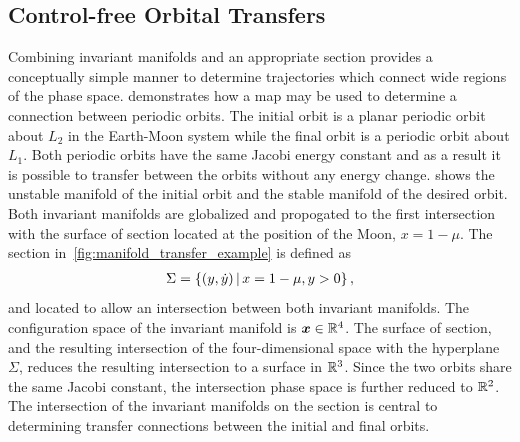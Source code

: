 \documentclass[preprint]{elsarticle}
\begin{document}
\subsection{Control-free Orbital Transfers}\label{sec:control-free_transfers}
Combining invariant manifolds and an appropriate \Poincare section provides a conceptually simple manner to determine trajectories which connect wide regions of the phase space.
 demonstrates how a \Poincare map may be used to determine a connection between periodic orbits.
The initial orbit is a planar periodic orbit about \( L_2 \) in the Earth-Moon system while the final orbit is a periodic orbit about \( L_1 \).
Both periodic orbits have the same Jacobi energy constant and as a result it is possible to transfer between the orbits without any energy change.
 shows the unstable manifold of the initial orbit and the stable manifold of the desired orbit. 
Both invariant manifolds are globalized and propogated to the first intersection with the \Poincare surface of section located at the position of the Moon, \( x = 1 - \mu \).
The \Poincare section in~\cref{fig:manifold_transfer_example} is defined as
\begin{align*}
	\Sigma = \left\{  ( y, \dot{y}) \, | \, x = 1- \mu, y > 0 \right\} , 
\end{align*}
and located to allow an intersection between both invariant manifolds.
The configuration space of the invariant manifold is \( \boldsymbol{x} \in \mathbb{R}^4 \).
The surface of section, and the resulting intersection of the four-dimensional space with the hyperplane \( \Sigma \), reduces the resulting intersection to a surface in \( \mathbb{R}^3\).
Since the two orbits share the same Jacobi constant, the intersection phase space is further reduced to \( \mathbb{R}^2\).
The intersection of the invariant manifolds on the \Poincare section is central to determining transfer connections between the initial and final orbits.
\end{document}
